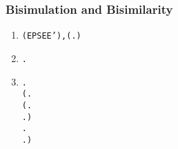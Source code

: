 \begin{frame}[fragile]
\frametitle{Bisimulation and Bisimilarity}
\begin{definition}
\begin{small}
\begin{enumerate}
\item \begin{alltt}
 (EPS E E'),  \HOLSymConst{=} (\HOLTokenLambda{} .  \HOLTokenTransBegin\HOLSymConst{\ensuremath{\tau}}\HOLTokenTransEnd {})\HOLSymConst{\HOLTokenSupStar{}}
\end{alltt}
\item \begin{alltt}
 \HOLTokenWeakTransBegin{}\HOLTokenWeakTransEnd {} \HOLSymConst{\HOLTokenEquiv{}} \HOLSymConst{\HOLTokenExists{}} .  \HOLSymConst{\HOLTokenEPS}  \HOLSymConst{\HOLTokenConj{}}  \HOLTokenTransBegin{}\HOLTokenTransEnd {} \HOLSymConst{\HOLTokenConj{}}  \HOLSymConst{\HOLTokenEPS} 
\end{alltt}
\item \begin{scriptsize}\begin{alltt}
  \HOLSymConst{\HOLTokenEquiv{}}
\HOLSymConst{\HOLTokenForall{}} .
       \HOLSymConst{\HOLTokenImp{}}
    (\HOLSymConst{\HOLTokenForall{}}.
         (\HOLSymConst{\HOLTokenForall{}}.
               \HOLTokenTransBegin{} \HOLTokenTransEnd {} \HOLSymConst{\HOLTokenImp{}}
              \HOLSymConst{\HOLTokenExists{}}.  \HOLTokenWeakTransBegin{} \HOLTokenWeakTransEnd {} \HOLSymConst{\HOLTokenConj{}}   ) \HOLSymConst{\HOLTokenConj{}}
         \HOLSymConst{\HOLTokenForall{}}.
              \HOLTokenTransBegin{} \HOLTokenTransEnd {} \HOLSymConst{\HOLTokenImp{}} \HOLSymConst{\HOLTokenExists{}}.  \HOLTokenWeakTransBegin{} \HOLTokenWeakTransEnd {} \HOLSymConst{\HOLTokenConj{}}   ) \HOLSymConst{\HOLTokenConj{}}

\end{alltt}
\end{scriptsize}
\end{enumerate}
\end{small}
\end{definition}
\end{frame}
